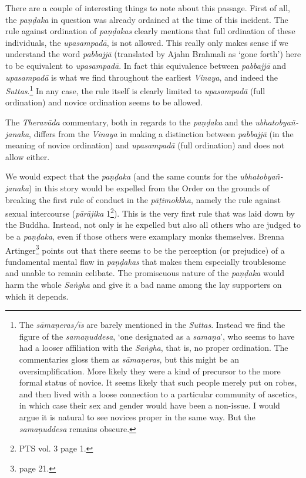 There are a couple of interesting things to note about this passage. First of all, the {\em paṇḍaka} in question was already ordained at the time of this incident. The rule against ordination of {\em paṇḍakas} clearly mentions that full ordination of these individuals, the {\em upasampadā}, is not allowed. This really only makes sense if we understand the word {\em pabbajjā} (translated by Ajahn Brahmali as `gone forth') here to be equivalent to {\em upasampadā}. In fact this equivalence between {\em pabbajjā} and {\em upasampadā} is what we find throughout the earliest {\em Vinaya}, and indeed the {\em Suttas}.\footnote{The {\em sāmaṇeras/īs} are barely mentioned in the {\em Suttas}. Instead we find the figure of the {\em samaṇuddesa}, `one designated as a {\em samaṇa}', who seems to have had a looser affiliation with the {\em Saṅgha}, that is, no proper ordination. The commentaries gloss them as {\em sāmaṇeras}, but this might be an oversimplification. More likely they were a kind of precursor to the more formal status of novice. It seems likely that such people merely put on robes, and then lived with a loose connection to a particular community of ascetics, in which case their sex and gender would have been a non-issue. I would argue it is natural to see novices proper in the same way. But the {\em samaṇuddesa} remains obscure.} In any case, the rule itself is clearly limited to {\em upasampadā} (full ordination) and novice ordination seems to be allowed.

The {\em Theravāda} commentary, both in regards to the {\em paṇḍaka} and the {\em ubhatob­yañ­janaka}, differs from the {\em Vinaya} in making a distinction between {\em pabbajjā} (in the meaning of novice ordination) and {\em upasampadā} (full ordination) and does not allow either.

We would expect that the {\em paṇḍaka} (and the same counts for the {\em ubhatob­yañ­janaka}) in this story would be expelled from the Order on the grounds of breaking the first rule of conduct in the {\em pāṭimokkha}, namely the rule against sexual intercourse ({\em pārājika} 1\footnote{PTS vol. 3 page 1.}). This is the very first rule that was laid down by the Buddha. Instead, not only is he expelled but also all others who are judged to be a {\em paṇḍaka}, even if those others were examplary monks themselves. Brenna Artinger\footnote{\cite{artinger} page 21.} points out that there seems to be the perception (or prejudice) of a fundamental mental flaw in {\em paṇḍakas} that makes them especially troublesome and unable to remain celibate. The promiscuous nature of the {\em paṇḍaka} would harm the whole {\em Saṅgha} and give it a bad name among the lay supporters on which it depends.

